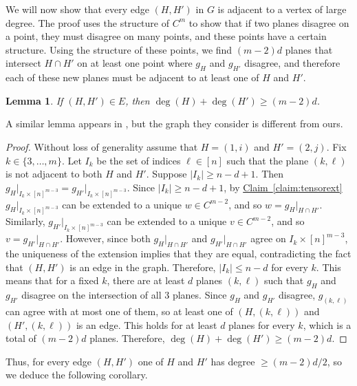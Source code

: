 \documentclass[11pt]{article}
\numberwithin{equation}{section}
\newtheorem{lemma}[theorem]{Lemma}
\theoremstyle{definition}
\theoremstyle{plain}
\newcommand{\expref}[2]{\hyperref[#2]{#1~\ref{#2}}}
\theoremstyle{plain}
\newcommand{\colored}{}
\newcommand{\plane}{{\colored{H}}} %
\newcommand{\otherplane}{\colored{ {H'}}} %
\newcommand{\codedist}{\colored{d}} %
\newcommand{\blocklength}{\colored{n}} %
\newcommand{\closestlocalword}[1]{ \colored{g_{#1}}} %
\newcommand{\word}{\colored{w}}
\newcommand{\otherword}{\colored{v}}
\newcommand\abs[1]{\colored{\left|#1\right|}}
\begin{document}
We will now show that every edge $(\plane, \otherplane)$ in $G$ is adjacent to a vertex of large degree. The proof uses the structure of $C^m$ to show that if two planes disagree on a point, they must disagree on many points, and these points have a certain structure. Using the structure of these points, we find $(m-2)\codedist$ planes that intersect $\plane \cap \otherplane$ on at least one point
%
where   %
$\closestlocalword{\plane}$ and $\closestlocalword{\otherplane}$ disagree, and therefore each of these new planes must be adjacent to at least one of $\plane$ and $\otherplane$.
\begin{lemma}\label{lemma:vc}
If $(\plane, \otherplane) \in E$, then $\deg(\plane) + \deg(\otherplane) \geq (m-2) \codedist$.
\end{lemma}
\noindent A similar lemma appears in \cite{Ben-SassonS06}, but the graph they consider is different from ours.
\begin{proof}
Without loss of generality assume that $\plane = (1,i)$ and $\otherplane = (2,j)$. Fix $k \in \{3, \dots, m\}$. Let $I_k$ be the
%
%
set of indices $\ell \in [\blocklength]$ such that                          %
%
the plane $(k,\ell)$ is not adjacent to both $\plane$ and $\otherplane$. Suppose $\abs{I_k} \geq \blocklength - \codedist + 1$. Then $\closestlocalword{\plane} \vert_{I_k \times [\blocklength]^{m-3}} = \closestlocalword{\otherplane} \vert_{I_k \times [\blocklength]^{m-3}}$. Since $\abs{I_k} \geq \blocklength - \codedist + 1$, by \expref{Claim}{claim:tensorext} $\closestlocalword{\plane} \vert_{I_k \times [\blocklength]^{m-3}}$ can be extended to a unique $\word \in C^{m-2}$, and so $\word = \closestlocalword{\plane} \vert_{\plane \cap \otherplane}$. Similarly, $\closestlocalword{\otherplane} \vert_{I_k \times [\blocklength]^{m-3}}$ can be extended to a unique $\otherword \in C^{m-2}$, and so $\otherword = \closestlocalword{\otherplane} \vert_{\plane \cap \otherplane}$. However, since both $ \closestlocalword{\plane} \vert_{\plane \cap \otherplane}$ and $ \closestlocalword{\otherplane} \vert_{\plane \cap \otherplane}$ agree on $I_k \times [\blocklength]^{m-3}$, the uniqueness of the extension implies that they are equal, contradicting the fact that $(\plane, \otherplane)$ is an edge in the graph. Therefore, $\abs{I_k} \leq \blocklength - \codedist$ for every $k$. This means that for a fixed $k$, there are at least $\codedist$ planes $(k,\ell)$ such that $\closestlocalword{\plane}$ and $\closestlocalword{\otherplane}$ disagree on the intersection of all $3$ planes. Since $\closestlocalword{\plane}$ and $\closestlocalword{\otherplane}$ disagree, $\closestlocalword{(k,\ell)}$ can agree with at most one of them, so at least one of $(\plane, (k,\ell))$ and $(\otherplane, (k,\ell))$ is an edge. This holds for at least $\codedist$ planes for every $k$, which is a total of $(m-2)\codedist$ planes. Therefore, $\deg(\plane) + \deg(\otherplane) \geq (m-2)\codedist$.    %
\end{proof}
%
Thus, for every edge $(\plane, \otherplane)$ one of $\plane$ and $\otherplane$ has degree $\geq (m-2)\codedist/2$, so we deduce the following corollary.
\end{document}
